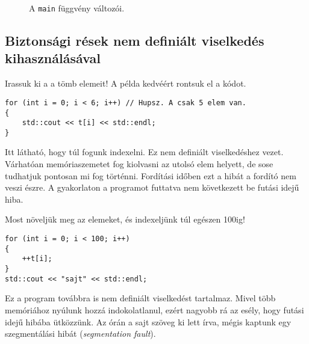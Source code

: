 \documentclass[a4paper,11.5pt,table]{article}
\begin{document}
	\begin{figure}[!h]
		\centering
		\smallskip
		
		A \texttt{main} függvény változói.
	\end{figure}
	\subsection{Biztonsági rések nem definiált viselkedés kihasználásával}
	Irassuk ki a a tömb elemeit! A példa kedvéért rontsuk el a kódot.
		\begin{lstlisting}
for (int i = 0; i < 6; i++) // Hupsz. A csak 5 elem van.
{
	std::cout << t[i] << std::endl;
}
	\end{lstlisting} 
	Itt látható, hogy túl fogunk indexelni. Ez {nem definiált viselkedés}hez vezet. Várhatóan memóriaszemetet fog kiolvasni az utolsó elem helyett, de sose tudhatjuk pontosan mi fog történni. Fordítási időben ezt a hibát a fordító nem veszi észre. A gyakorlaton a programot futtatva nem következett be futási idejű hiba.
	
	Most növeljük meg az elemeket, és indexeljünk túl egészen 100ig!
	\begin{lstlisting}
for (int i = 0; i < 100; i++)
{
	++t[i];
}
std::cout << "sajt" << std::endl;
	\end{lstlisting} 
	Ez a program továbbra is nem definiált viselkedést tartalmaz. Mivel több memóriához nyúlunk hozzá indokolatlanul, ezért nagyobb rá az esély, hogy futási idejű hibába ütközzünk. Az órán a {sajt} szöveg ki lett írva, mégis kaptunk egy szegmentálási hibát (\textit{segmentation fault}).
	
\end{document}
